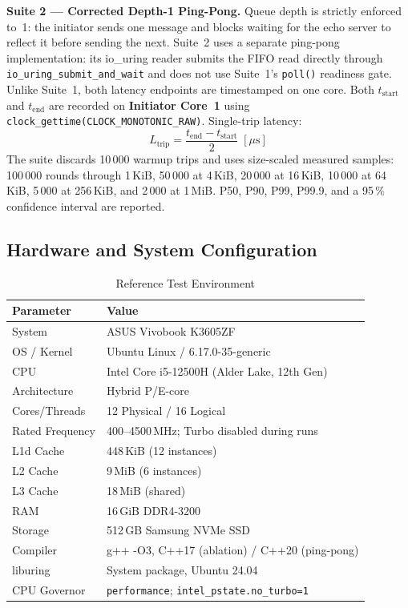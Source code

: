 \documentclass[10pt,conference]{IEEEtran}
\begin{document}
\textbf{Suite 2 --- Corrected Depth-1 Ping-Pong.}
Queue depth is strictly enforced to~1: the initiator sends one message and
blocks waiting for the echo server to reflect it before sending the next.
Suite~2 uses a separate ping-pong implementation: its io\_uring reader
submits the FIFO read directly through \texttt{io\_uring\_submit\_and\_wait}
and does not use Suite~1's \texttt{poll()} readiness gate.
Unlike Suite~1, both latency endpoints are timestamped on one core.
Both $t_{\text{start}}$ and $t_{\text{end}}$ are recorded on
\textbf{Initiator Core~1} using
\texttt{clock\_gettime(CLOCK\_MONOTONIC\_RAW)}.  Single-trip latency:
\[
  L_{\mathrm{trip}} = \frac{t_{\mathrm{end}} - t_{\mathrm{start}}}{2}\;[\mu\mathrm{s}]
\]
The suite discards 10\,000 warmup trips and uses size-scaled measured samples:
100\,000 rounds through 1\,KiB, 50\,000 at 4\,KiB, 20\,000 at 16\,KiB,
10\,000 at 64\,KiB, 5\,000 at 256\,KiB, and 2\,000 at 1\,MiB. P50, P90,
P99, P99.9, and a 95\,\% confidence interval are reported.

\subsection{Hardware and System Configuration}

\begin{table}[!t]
  \centering
  \caption{Reference Test Environment}
  \label{tab:env}
  \small
  \begin{tabular}{@{}L{3.0cm}L{4.8cm}@{}}
    \toprule
    \textbf{Parameter} & \textbf{Value}\\
    \midrule
    System          & ASUS Vivobook K3605ZF \\
    OS / Kernel     & Ubuntu Linux / 6.17.0-35-generic \\
    CPU             & Intel Core i5-12500H (Alder Lake, 12th Gen) \\
    Architecture    & Hybrid P/E-core \\
    Cores/Threads   & 12 Physical / 16 Logical \\
    Rated Frequency & 400--4500\,MHz; Turbo disabled during runs \\
    L1d Cache       & 448\,KiB (12 instances) \\
    L2 Cache        & 9\,MiB (6 instances) \\
    L3 Cache        & 18\,MiB (shared) \\
    RAM             & 16\,GiB DDR4-3200 \\
    Storage         & 512\,GB Samsung NVMe SSD \\
    Compiler        & g++ -O3, C++17 (ablation) / C++20 (ping-pong) \\
    liburing        & System package, Ubuntu 24.04 \\
    CPU Governor    & \texttt{performance}; \texttt{intel\_pstate.no\_turbo=1} \\
    \bottomrule
  \end{tabular}
\end{table}
\end{document}
